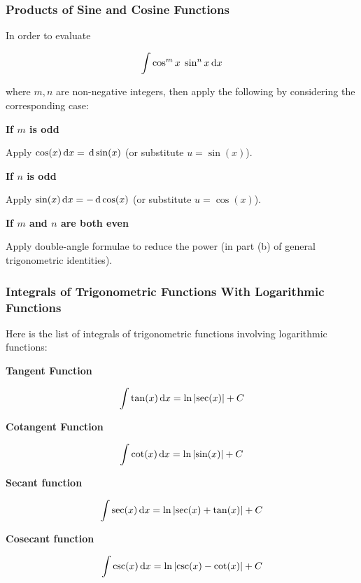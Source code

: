 \documentclass[a4paper,12pt]{article}
\begin{document}
\subsubsection{Products of Sine and Cosine Functions}
In order to evaluate

$$\int\cos^{m}x\;\sin^{n}x\,\mathrm{d} x$$\s

where $m,n$ are non-negative integers, then apply the following by considering the corresponding case:

\begin{alist}
  \item \textbf{If $m$ is odd}\n

  Apply $\cos(x)\,\mathrm{d} x=\,\mathrm{d}\sin(x)$ (or substitute $u=\sin(x)$).

  \item \textbf{If $n$ is odd}\n

  Apply $\sin(x)\,\mathrm{d} x=-\,\mathrm{d}\cos(x)$ (or substitute $u=\cos(x)$).

  \item \textbf{If $m$ and $n$ are both even}\n

  Apply double-angle formulae to reduce the power (in part (b) of general trigonometric identities).
\end{alist}

\subsubsection{Integrals of Trigonometric Functions With Logarithmic Functions}
Here is the list of integrals of trigonometric functions involving logarithmic functions:

\begin{alist}
  \item \textbf{Tangent Function}

  $$\int\tan(x)\,\mathrm{d} x=\ln\left| \sec(x)\right|+C$$

  \item \textbf{Cotangent Function}

  $$\int\cot(x)\,\mathrm{d} x=\ln\left| \sin(x)\right|+C$$

  \item \textbf{Secant function}

  $$\int\sec(x)\,\mathrm{d} x=\ln\left| \sec(x)+\tan(x)\right|+C$$

  \item \textbf{Cosecant function}

  $$\int\csc(x)\,\mathrm{d} x=\ln\left| \csc(x)-\cot(x)\right|+C$$
\end{alist}
\end{document}
